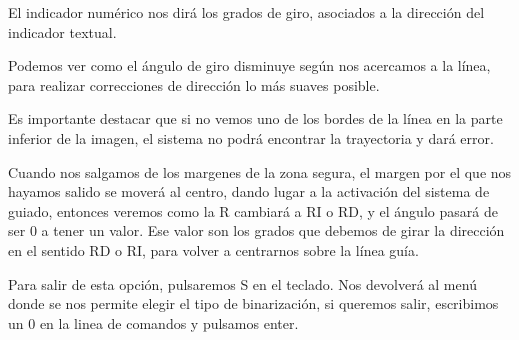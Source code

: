 El indicador numérico nos dirá los grados de giro, asociados a la dirección del indicador textual.

Podemos ver como el ángulo de giro disminuye según nos acercamos a la línea, para realizar correcciones de dirección lo más suaves posible.

Es importante destacar que si no vemos uno de los bordes de la línea en la parte inferior de la imagen, el sistema no podrá encontrar la trayectoria y dará error.

Cuando nos salgamos de los margenes de la zona segura, el margen por el que nos hayamos salido se moverá al centro, dando lugar a la activación del sistema de guiado, entonces veremos como la R cambiará a RI o RD, y el ángulo pasará de ser 0 a tener un valor. Ese valor son los grados que debemos de girar la dirección en el sentido RD o RI, para volver a centrarnos sobre la línea guía.

Para salir de esta opción, pulsaremos S en el teclado. Nos devolverá al menú donde se nos permite elegir el tipo de binarización, si queremos salir, escribimos un 0 en la linea de comandos y pulsamos enter.



